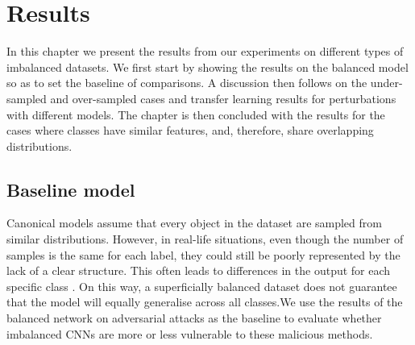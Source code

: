 \chapter{Results} \label{chap:results}
In this chapter we present the results from our experiments on different types of imbalanced datasets. We first start by showing the results on the balanced model so as to set the baseline of comparisons. A discussion then follows on the under-sampled and over-sampled cases and transfer learning results for perturbations with different models. The chapter is then concluded with the results for the cases where classes have similar features, and, therefore, share overlapping distributions.

\section{Baseline model}
Canonical models assume that every object in the dataset are sampled from similar distributions. However, in real-life situations, even though the number of samples is the same for each label, they could still be poorly represented by the lack of a clear structure. This often leads to differences in the output for each specific class \cite{krawczyk2016learning}. On this way, a superficially balanced dataset does not guarantee that the model will equally generalise across all classes.We use the results of the balanced network on adversarial attacks as the baseline
to evaluate whether imbalanced CNNs are more or less vulnerable to these malicious methods.

